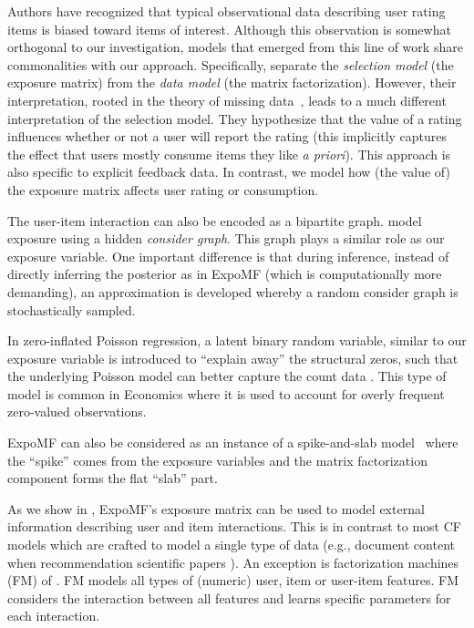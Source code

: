  Authors have recognized that typical
observational data describing user rating items is biased toward items of
interest. Although this observation is somewhat orthogonal to our
investigation, models that emerged from this line of work share
commonalities with our approach.  Specifically, \citet{DBLP:conf/uai/MarlinZRS07,ling12response}
separate the \emph{selection model} (the exposure matrix) from the
\emph{data model} (the matrix factorization). However, their
interpretation, rooted in the theory of missing data~\cite{little1986statistical}, leads to a
much different interpretation of the selection model. They hypothesize
that the value of a rating influences whether or not a user will report
the rating (this implicitly captures the effect that users mostly consume
items they like \emph{a priori}). This approach is also specific to
explicit feedback data. In contrast, we model how (the value of) the
exposure matrix affects user rating or consumption. 

 The user-item
interaction can also be encoded as a bipartite graph.
\citet{paquet2013one} model exposure using a hidden \emph{consider graph}.
This graph plays a similar role as our exposure variable. One important
difference is that during inference, instead of directly inferring the
posterior as in ExpoMF (which is computationally more demanding), an
approximation is developed whereby a random consider graph is
stochastically sampled.


 In zero-inflated Poisson regression, a
latent binary random variable, similar to our exposure variable is introduced to ``explain away'' the structural zeros, such that the
underlying Poisson model can better capture the count data
\cite{lambert1992zero}. This type of model is common in Economics where it is used
to account for overly frequent zero-valued observations.  

ExpoMF can also be considered as an instance of a spike-and-slab model~\cite{ishwaran2005spike} where the ``spike'' comes from the exposure variables and the matrix factorization component forms the flat ``slab'' part. 

 As we show in ,
ExpoMF's exposure matrix can be used to model external information describing user
and item interactions. This is in contrast to most CF models which are
crafted to model a single type of data (e.g., document content when
recommendation scientific papers \cite{wang2011collaborative}). An exception is
factorization machines (FM) of \citet{rendle2010fm}. FM models all types of
(numeric) user, item or user-item features. FM considers the interaction
between all features and learns specific parameters for each interaction.


